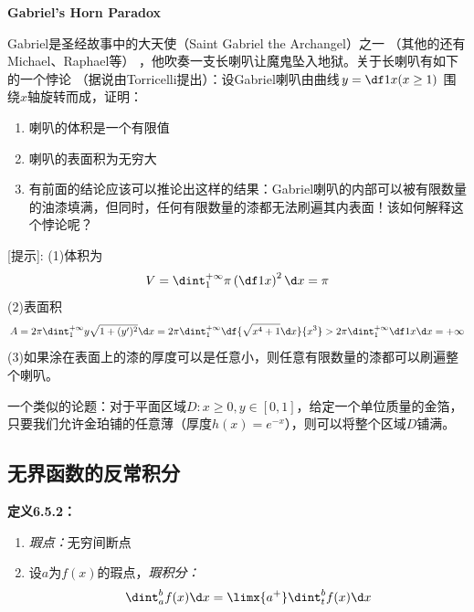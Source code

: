 \begin{shaded}
	{\bf Gabriel's Horn Paradox}
	
	\begin{center}
	\end{center}
	
	Gabriel是圣经故事中的大天使（Saint Gabriel the Archangel）之一
	（其他的还有Michael、Raphael等）
	，他吹奏一支长喇叭让魔鬼坠入地狱。关于长喇叭有如下的一个悖论
	（据说由Torricelli提出）：设Gabriel喇叭由曲线$y=\df1x(x\geq 1)$
	围绕$x$轴旋转而成，证明：
	\begin{enumerate} [(1)]
  	  \setlength{\itemindent}{1cm}
	  \item 喇叭的体积是一个有限值
	  \item 喇叭的表面积为无穷大
	  \item 有前面的结论应该可以推论出这样的结果：Gabriel喇叭的内部可以被有限数量
	  的油漆填满，但同时，任何有限数量的漆都无法刷遍其内表面！该如何解释这个悖论呢？
	\end{enumerate}
	[提示]:
	(1)体积为
	$$V=\dint_1^{+\infty}\pi\left(\df1x\right)^2\d x=\pi$$
	(2)表面积
	$$A=2\pi\dint_1^{+\infty}y\sqrt{1+(y')^2}\d x=2\pi\dint_1^{+\infty}
	\df{\sqrt{x^4+1}\d x}{x^3}>2\pi\dint_1^{+\infty}\df1x\d x=+\infty$$
	(3)如果涂在表面上的漆的厚度可以是任意小，则任意有限数量的漆都可以刷遍整个喇叭。
	
	一个类似的论题：对于平面区域$D:x\geq0,y\in[0,1]$，给定一个单位质量的金箔，
	只要我们允许金珀铺的任意薄（厚度$h(x)=e^{-x}$），则可以将整个区域$D$铺满。
\end{shaded}

\subsection{无界函数的反常积分}

{\bf 定义6.5.2：}
\begin{enumerate} [(1)]
  \setlength{\itemindent}{1cm}
  \item {\it 瑕点：}无穷间断点 
  \item 设$a$为$f(x)$的瑕点，{\it 瑕积分：}
  $$\dint_a^bf(x)\d x=\limx{a^+}\dint_t^bf(x)\d x$$
\end{enumerate}

